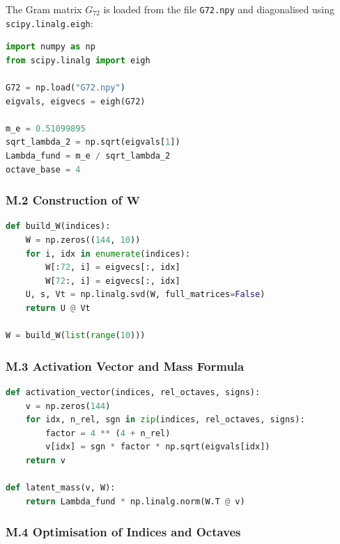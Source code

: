\documentclass[11pt]{article}
\begin{document}
The Gram matrix \(G_{72}\) is loaded from the file \texttt{G72.npy} and
diagonalised using \texttt{scipy.linalg.eigh}:

\begin{lstlisting}[language=Python]
import numpy as np
from scipy.linalg import eigh

G72 = np.load("G72.npy")
eigvals, eigvecs = eigh(G72)

m_e = 0.51099895
sqrt_lambda_2 = np.sqrt(eigvals[1])
Lambda_fund = m_e / sqrt_lambda_2
octave_base = 4
\end{lstlisting}

\hypertarget{m.2-construction-of-mathbfw}{%
\subsubsection{\texorpdfstring{M.2 Construction of
\(\mathbf{W}\)}{M.2 Construction of \textbackslash mathbf\{W\}}}\label{m.2-construction-of-mathbfw}}

\begin{lstlisting}[language=Python]
def build_W(indices):
    W = np.zeros((144, 10))
    for i, idx in enumerate(indices):
        W[:72, i] = eigvecs[:, idx]
        W[72:, i] = eigvecs[:, idx]
    U, s, Vt = np.linalg.svd(W, full_matrices=False)
    return U @ Vt

W = build_W(list(range(10)))
\end{lstlisting}

\hypertarget{m.3-activation-vector-and-mass-formula}{%
\subsubsection{M.3 Activation Vector and Mass
Formula}\label{m.3-activation-vector-and-mass-formula}}

\begin{lstlisting}[language=Python]
def activation_vector(indices, rel_octaves, signs):
    v = np.zeros(144)
    for idx, n_rel, sgn in zip(indices, rel_octaves, signs):
        factor = 4 ** (4 + n_rel)
        v[idx] = sgn * factor * np.sqrt(eigvals[idx])
    return v

def latent_mass(v, W):
    return Lambda_fund * np.linalg.norm(W.T @ v)
\end{lstlisting}

\hypertarget{m.4-optimisation-of-indices-and-octaves}{%
\subsubsection{M.4 Optimisation of Indices and
Octaves}\label{m.4-optimisation-of-indices-and-octaves}}
\end{document}
